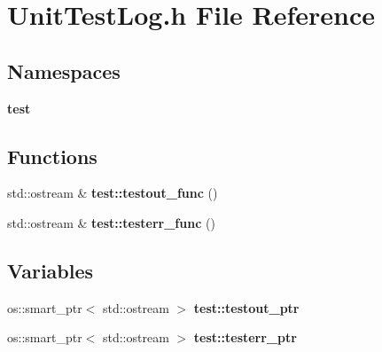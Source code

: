 \section{Unit\+Test\+Log.\+h File Reference}
\label{UnitTestLog_8h}
\subsection*{Namespaces}
\begin{DoxyCompactItemize}
\item 
 {\bf test}
\end{DoxyCompactItemize}
\subsection*{Functions}
\begin{DoxyCompactItemize}
\item 
std\+::ostream \& {\bf test\+::testout\+\_\+func} ()
\item 
std\+::ostream \& {\bf test\+::testerr\+\_\+func} ()
\end{DoxyCompactItemize}
\subsection*{Variables}
\begin{DoxyCompactItemize}
\item 
os\+::smart\+\_\+ptr$<$ std\+::ostream $>$ {\bf test\+::testout\+\_\+ptr}
\item 
os\+::smart\+\_\+ptr$<$ std\+::ostream $>$ {\bf test\+::testerr\+\_\+ptr}
\end{DoxyCompactItemize}
